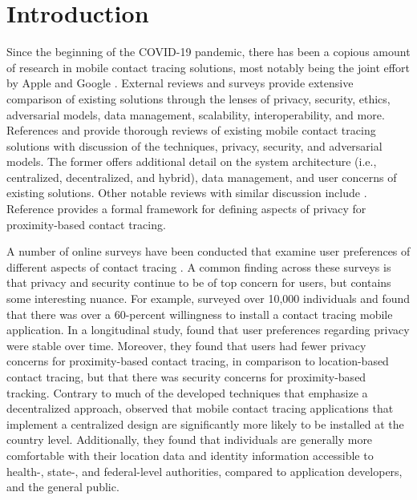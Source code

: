 \chapter{Introduction} %

Since the beginning of the COVID-19 pandemic, there has been a copious amount of research in mobile contact tracing solutions, most notably being the joint effort by Apple and Google \cite{AppleGoogle}. External reviews and surveys provide extensive comparison of existing solutions through the lenses of privacy, security, ethics, adversarial models, data management, scalability, interoperability, and more. References \cite{Ahmed2020} and \cite{Martin2020} provide thorough reviews of existing mobile contact tracing solutions with discussion of the techniques, privacy, security, and adversarial models. The former offers additional detail on the system architecture (i.e., centralized, decentralized, and hybrid), data management, and user concerns of existing solutions. Other notable reviews with similar discussion include \cite{Wen2020, Raskar2020, Cho2020, Dar2020, Lucivero2020}. Reference \cite{Kuhn2021} provides a formal framework for defining aspects of privacy for proximity-based contact tracing.

A number of online surveys have been conducted that examine user preferences of different aspects of contact tracing \cite{Simko2020, Altmann2020, Li2020}. A common finding across these surveys is that privacy and security continue to be of top concern for users, but contains some interesting nuance. For example, \cite{Altmann2020} surveyed over 10,000 individuals and found that there was over a 60-percent willingness to install a contact tracing mobile application. In a longitudinal study, \cite{Simko2020} found that user preferences regarding privacy were stable over time. Moreover, they found that users had fewer privacy concerns for proximity-based contact tracing, in comparison to location-based contact tracing, but that there was security concerns for proximity-based tracking. Contrary to much of the developed techniques that emphasize a decentralized approach, \cite{Li2020} observed that mobile contact tracing applications that implement a centralized design are significantly more likely to be installed at the country level. Additionally, they found that individuals are generally more comfortable with their location data and identity information accessible to health-, state-, and federal-level authorities, compared to application developers, and the general public.

